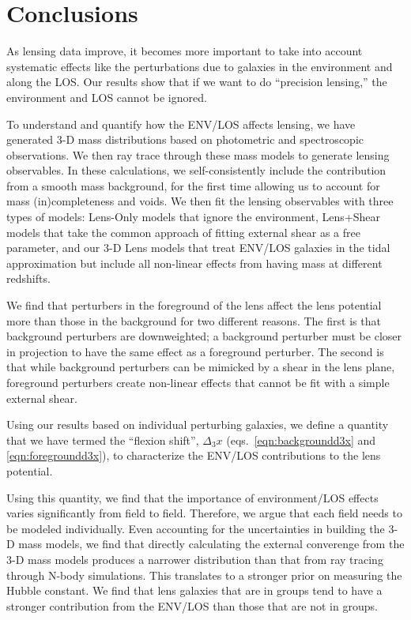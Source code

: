 \documentclass{emulateapj}
\begin{document}
\section{Conclusions}

As lensing data improve, it becomes more important to take into account systematic effects like the perturbations due to galaxies in the environment and along the LOS. Our results show that if we want to do ``precision lensing,'' the environment and LOS cannot be ignored.

To understand and quantify how the ENV/LOS affects lensing, we have generated 3-D mass distributions based on photometric and spectroscopic observations. We then ray trace through these mass models to generate lensing observables. In these calculations, we self-consistently include the contribution from a smooth mass background, for the first time allowing us to account for mass (in)completeness and voids. We then fit the lensing observables with three types of models: Lens-Only models that ignore the environment, Lens+Shear models that take the common approach of fitting external shear as a free parameter, and our 3-D Lens models that treat ENV/LOS galaxies in the tidal approximation but include all non-linear effects from having mass at different redshifts.

We find that perturbers in the foreground of the lens affect the lens potential more than those in the background for two different reasons. The first is that background perturbers are downweighted; a background perturber must be closer in projection to have the same effect as a foreground perturber. The second is that while background perturbers can be mimicked by a shear in the lens plane, foreground perturbers create non-linear effects that cannot be fit with a simple external shear.

Using our results based on individual perturbing galaxies, we define a quantity that we have termed the ``flexion shift'', $\Delta_3 x$ (eqs.\ \ref{eqn:backgroundd3x} and \ref{eqn:foregroundd3x}), to characterize the ENV/LOS contributions to the lens potential.

Using this quantity, we find that the importance of environment/LOS effects varies significantly from field to field. Therefore, we argue that each field needs to be modeled individually. Even accounting for the uncertainties in building the 3-D mass models, we find that directly calculating the external converenge from the 3-D mass models produces a narrower distribution than that from ray tracing through N-body simulations. This translates to a stronger prior on measuring the Hubble constant. We find that lens galaxies that are in groups tend to have a stronger contribution from the ENV/LOS than those that are not in groups. 
\end{document}
